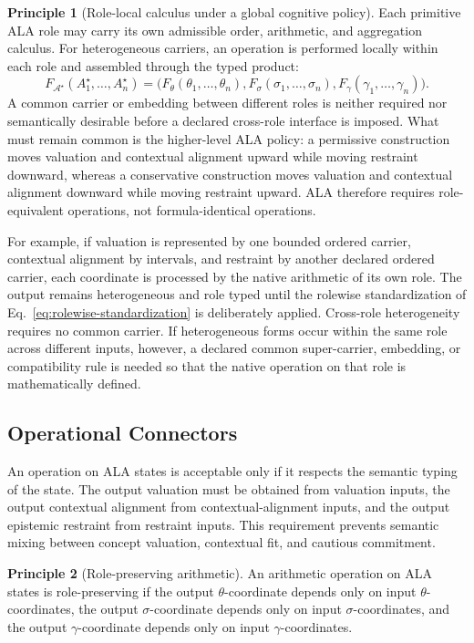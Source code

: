 \documentclass[reqno,final]{amsart}
\theoremstyle{definition}
\newtheorem{principle}{Principle}
\theoremstyle{plain}
\theoremstyle{remark}
\begin{document}
\begin{principle}[Role-local calculus under a global cognitive policy]
\label{prin:role-local-calculus}
Each primitive ALA role may carry its own admissible order, arithmetic, and aggregation calculus. For heterogeneous carriers, an operation is performed locally within each role and assembled through the typed product:
\[
F_{\mathcal A^{\star}}
(A_1^{\star},\ldots,A_n^{\star})
=
\bigl(
F_\theta(\theta_1,\ldots,\theta_n),
F_\sigma(\sigma_1,\ldots,\sigma_n),
F_\gamma(\gamma_1,\ldots,\gamma_n)
\bigr).
\]
A common carrier or embedding between different roles is neither required nor semantically desirable before a declared cross-role interface is imposed. What must remain common is the higher-level ALA policy: a permissive construction moves valuation and contextual alignment upward while moving restraint downward, whereas a conservative construction moves valuation and contextual alignment downward while moving restraint upward. ALA therefore requires role-equivalent operations, not formula-identical operations.
\end{principle}

For example, if valuation is represented by one bounded ordered carrier, contextual alignment by intervals, and restraint by another declared ordered carrier, each coordinate is processed by the native arithmetic of its own role. The output remains heterogeneous and role typed until the rolewise standardization of Eq.~\eqref{eq:rolewise-standardization} is deliberately applied. Cross-role heterogeneity requires no common carrier. If heterogeneous forms occur within the same role across different inputs, however, a declared common super-carrier, embedding, or compatibility rule is needed so that the native operation on that role is mathematically defined.

\subsection{Operational Connectors}
\label{subsec:arithmetic-design}

An operation on ALA states is acceptable only if it respects the semantic typing of the state. The output valuation must be obtained from valuation inputs, the output contextual alignment from contextual-alignment inputs, and the output epistemic restraint from restraint inputs. This requirement prevents semantic mixing between concept valuation, contextual fit, and cautious commitment.

\begin{principle}[Role-preserving arithmetic]
\label{principle:role-preserving-arithmetic}
An arithmetic operation on ALA states is role-preserving if the output \(\theta\)-coordinate depends only on input \(\theta\)-coordinates, the output \(\sigma\)-coordinate depends only on input \(\sigma\)-coordinates, and the output \(\gamma\)-coordinate depends only on input \(\gamma\)-coordinates.
\end{principle}
\end{document}
